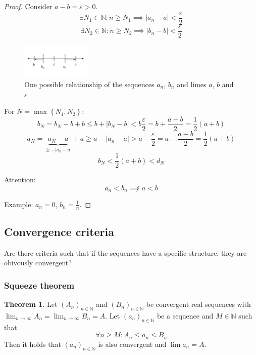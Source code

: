 \documentclass[a4paper,landscape,twocolumn]{article}
\theoremstyle{definition}
\newtheorem{theorem}{Theorem}
\newcommand\set[1]{\left\{#1\right\}}
\newcommand\abs[1]{\left|#1\right|}
\newcommand\seq[1]{{\left(#1\right)}_{n \in \mathbb N}}
\begin{document}
\begin{proof}
  Consider $a - b = \varepsilon > 0$.
  \[ \exists N_1 \in \mathbb N: n \geq N_1 \implies \abs{a_n - a} < \frac{\varepsilon}{2} \]
  \[ \exists N_2 \in \mathbb N: n \geq N_2 \implies \abs{b_n - b} < \frac{\varepsilon}{2} \]

  \begin{figure}[!h]
    \begin{center}
      \includegraphics[width=0.3\textwidth]{img/limes.pdf}
      \caption{One possible relationship of the sequences $a_n$, $b_n$ and limes $a$, $b$ and $\varepsilon$}
    \end{center}
  \end{figure}

  For $N = \max\set{N_1, N_2}$:
  \[
      b_N
      = b_N - b + b \leq b + \abs{b_N - b} < b \frac{\varepsilon}{2}
      = b + \frac{a - b}{2}
      = \frac12 (a + b)
  \] \[
      a_N
      = \underbrace{a_N - a}_{\geq -\abs{a_n - a}} + a \geq a - \abs{a_n - a} > a - \frac{\varepsilon}{2}
      = a - \frac{a - b}{2}
      = \frac12 (a + b)
  \] \[
      b_N < \frac12 (a + b) < d_N
  \]

  Attention:
  \[ a_n < b_n \not\implies a < b \]

  Example: $a_n = 0$, $b_n = \frac1n$.
\end{proof}

\subsection{Convergence criteria}
%
Are there criteria such that if the sequences have a specific structure,
they are obivously convergent?

\subsubsection{Squeeze theorem}
\begin{theorem}
  Let $\seq{A_n}$ and $\seq{B_n}$ be convergent real sequences with $\lim_{n \to \infty} A_n = \lim_{n \to \infty} B_n = A$.
  Let $\seq{a_n}$ be a sequence and $M \in \mathbb N$ such that
  \[ \forall n \geq M: A_n \leq a_n \leq B_n \]
  Then it holds that $\seq{a_n}$ is also convergent and $\lim{a_n} = A$.
\end{theorem}
\end{document}
